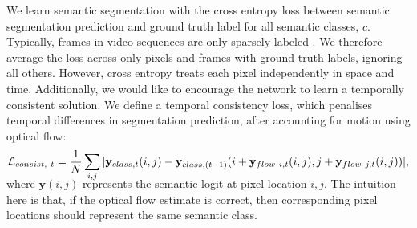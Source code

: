 We learn semantic segmentation with the cross entropy loss between semantic segmentation prediction and ground truth label for all semantic classes, $c$.
Typically, frames in video sequences are only sparsely labeled \citep{Cordts2016Cityscapes}. We therefore average the loss across only pixels and frames with ground truth labels, ignoring all others.
However, cross entropy treats each pixel independently in space and time. Additionally, we would like to encourage the network to learn a temporally consistent solution. We define a temporal consistency loss, which penalises temporal differences in segmentation prediction, after accounting for motion using optical flow:
\begin{multline}
\vspace{-1mm}
\mathcal{L}_{consist,~t} = \frac{1}{N} \sum_{i,j} | \mathbf{y}_{class,t}(i,j) - \mathbf{y}_{class,(t-1)}(i+\mathbf{y}_{flow~i,t}(i,j),j+\mathbf{y}_{flow~j,t}(i,j)) |,
\label{eqn:consistency}
\vspace{-3mm}
\end{multline}
where $\mathbf{y}(i,j)$ represents the semantic logit at pixel location $i,j$. The intuition here is that, if the optical flow estimate is correct, then corresponding pixel locations should represent the same semantic class.

